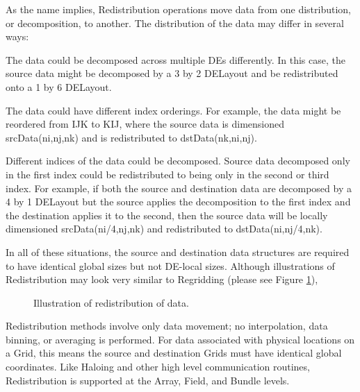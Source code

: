 

As the name implies, Redistribution operations move data from one distribution,
or decomposition, to another.  The distribution of the data may differ in several 
ways:
 \begin{description}

  \item The data could be decomposed across multiple DEs differently.  In this
        case, the source data might be decomposed by a 3 by 2 DELayout and be
        redistributed onto a 1 by 6 DELayout.

  \item The data could have different index orderings.  For example, the data
        might be reordered from IJK to KIJ, where the source data is
        dimensioned srcData(ni,nj,nk) and is redistributed to dstData(nk,ni,nj).

  \item Different indices of the data could be decomposed.  Source data
        decomposed only in the first index could be redistributed to being
        only in the second or third index.  For example, if both the source
        and destination data are decomposed by a 4 by 1 DELayout but the source
        applies the decomposition to the first index and the destination
        applies it to the second, then the source data will be locally
        dimensioned srcData(ni/4,nj,nk) and redistributed to dstData(ni,nj/4,nk).

 \end{description}

In all of these situations, the source and destination data structures are
required to have identical global sizes but not DE-local sizes.  Although
illustrations of Redistribution may look very similar to Regridding (please
see Figure \ref{fig:Redist}),

\begin{center}
\begin{figure}
\label{fig:Redist}
\caption{Illustration of redistribution of data. }
\end{figure}
\end{center}

Redistribution methods involve only data movement; no interpolation, data
binning, or averaging is performed.  For data associated with physical locations
on a Grid, this means the source and destination Grids must have identical
global coordinates.  Like Haloing and other high level communication routines,
Redistribution is supported at the Array, Field, and Bundle levels. 

